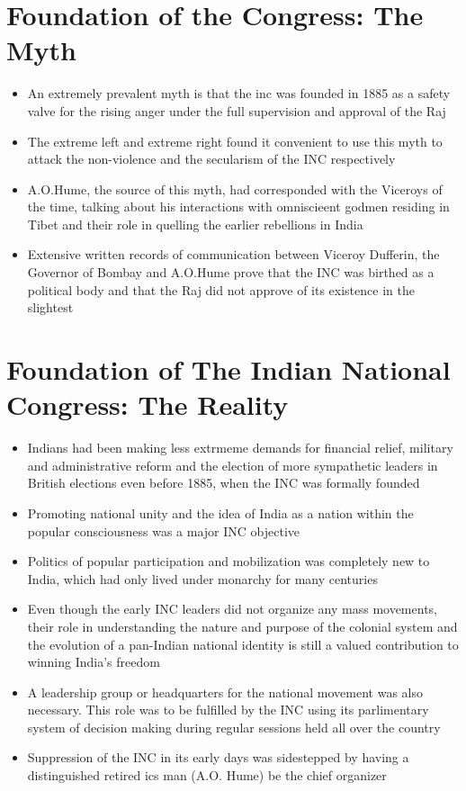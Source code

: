 \section{Foundation of the Congress: The Myth}
\begin{itemize}
    \item An extremely prevalent myth is that the \gls{inc} was founded in 1885 as a safety valve for the  rising anger under the full supervision and approval of the Raj
    \item The extreme left and extreme right found it convenient to use this myth to attack the non-violence and the secularism of the INC respectively
    \item A.O.Hume, the source of this myth, had corresponded with the Viceroys of the time, talking about his interactions with omniscieent godmen residing in Tibet and their role in quelling the earlier rebellions in India
    \item Extensive written records of communication between Viceroy Dufferin, the Governor of Bombay and A.O.Hume prove that the INC was birthed as a political body and that the Raj did not approve of its existence in the slightest
\end{itemize}

\section{Foundation of The Indian National Congress: The Reality}
\begin{itemize}
    \item Indians had been making less extrmeme demands for financial relief, military and administrative reform and the election of more sympathetic leaders in British elections even before 1885, when the INC was formally founded
    \item Promoting national unity and the idea of India as a nation within the popular consciousness was a major INC objective
    \item Politics of popular participation and mobilization was completely new to India, which had only lived under monarchy for many centuries
    \item Even though the early INC leaders did not organize any mass movements, their role in understanding the nature and purpose of the colonial system and the evolution of a pan-Indian national identity is still a valued contribution to winning India's freedom
    \item A leadership group  or headquarters for the national movement was also necessary. This role was to be fulfilled by the INC using its parlimentary system of decision making during regular sessions held all over the country
    \item Suppression of the INC in its early days was sidestepped by having a distinguished retired \gls{ics} man (A.O. Hume) be the chief organizer
\end{itemize}

